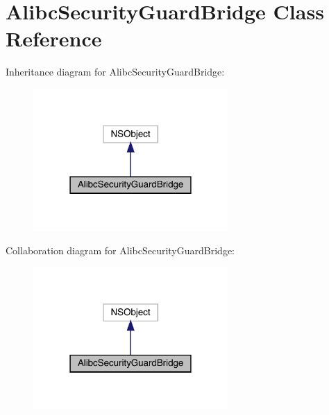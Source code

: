 \hypertarget{interface_alibc_security_guard_bridge}{}\section{Alibc\+Security\+Guard\+Bridge Class Reference}
\label{interface_alibc_security_guard_bridge}


Inheritance diagram for Alibc\+Security\+Guard\+Bridge\+:\nopagebreak
\begin{figure}[H]
\begin{center}
\leavevmode
\includegraphics[width=210pt]{interface_alibc_security_guard_bridge__inherit__graph}
\end{center}
\end{figure}


Collaboration diagram for Alibc\+Security\+Guard\+Bridge\+:\nopagebreak
\begin{figure}[H]
\begin{center}
\leavevmode
\includegraphics[width=210pt]{interface_alibc_security_guard_bridge__coll__graph}
\end{center}
\end{figure}
